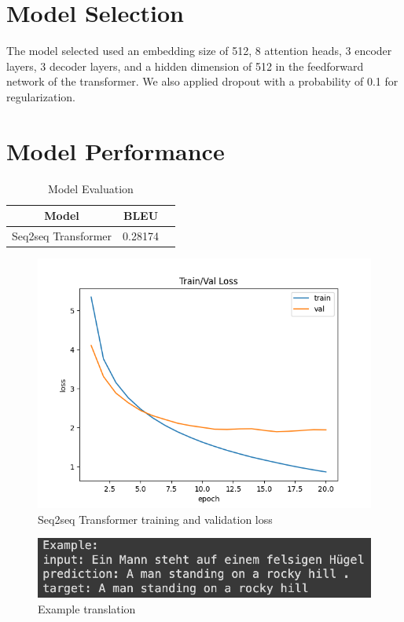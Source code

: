 \documentclass{article}
\begin{document}
\section{Model Selection}
The model selected used an embedding size of 512, 8 attention heads, 3 encoder
layers, 3 decoder layers, and a hidden dimension of 512 in the feedforward
network of the transformer. We also applied dropout with a probability of 0.1
for regularization.

\section{Model Performance}

\begin{table}[h]
\begin{center}
\begin{tabular}{c|c|c}
    Model & BLEU \\
    \hline
    Seq2seq Transformer & 0.28174 \\
\end{tabular}
\end{center}
\caption{Model Evaluation}
\label{table:evaluation_matrix}
\end{table}

\begin{figure}[h]
    \centering
    \includegraphics[width=1.0\textwidth]{./images/train_val_loss.png}
    \caption{Seq2seq Transformer training and validation loss}
    \label{fig:loss_plot}
\end{figure}

\begin{figure}[h]
    \centering
    \includegraphics[width=1.0\textwidth]{./images/translation_example.png}
    \caption{Example translation}
    \label{fig:translation_example}
\end{figure}
\end{document}
